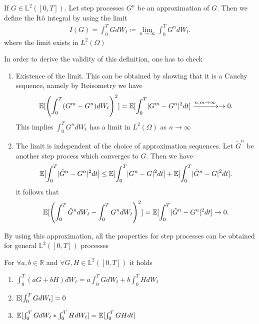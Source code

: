 \begin{definition}[It\^p Integral]\label{ito_integral}
  If $G \in  \mathbb{L}^2([0,T])$. Let step processes $G^{n} $ be an approximation of $G$. Then we define
  the It\^o  integral by using the limit 
  \begin{align*}
    I(G) = \int_0^{T} GdW_t \coloneqq  \lim_{n\to \infty} \int_0^{T} G^{n} dW_t
  .\end{align*}
  where the limit exists in $L^2(\Omega)$
\end{definition}
In order to derive the validity of this definition, one has to check 
\begin{enumerate}
  \item Existence of the limit. This can be obtained by showing that it is a Cauchy sequence, namely by It\o isometry we have
    \begin{align*}
      \mathbb{E}[\left( \int_0^{T} (G^{m} - G^{n}  ) dW_t  \right)^2 ] = \mathbb{E}[\int_0^{T} \lvert G^{m} - G^{n}  \rvert^2 dt] \xrightarrow{n,m\to \infty} \to 0
    .\end{align*}
    This implies $\int_0^{T} G^{n} dW_t  $ has a limit in $L^2(\Omega )$ as $n\to \infty$
  \item The limit is independent of the choice of approximation sequences.
    Let $\tilde{G}^{n}  $ be another step process which converges to $G$. Then we have 
    \begin{align*}
      \mathbb{E}[\int_0^{T} \lvert\tilde{G}^{n} - G^{n}   \rvert^2 dt ] \le  \mathbb{E}[\int_0^{T} \lvert G^{n} - G \rvert^2 dt ] + \mathbb{E}[\int_0^{T} \lvert\tilde{G}^{n} - G  \rvert^2 dt ]
    .\end{align*}
    it follows that 
    \begin{align*}
      \mathbb{E}[\left( \int_0^{T} \tilde{G}^{n} dW_t - \int_0^{T} G^{n} dW_t      \right)^2 ] = \mathbb{E}[\int_0^{T} \lvert\tilde{G}^{n} - G^{n}   \rvert^2 dt ] \to 0
    .\end{align*}
\end{enumerate}
By using this approximation, all the properties for step  processes can be obtained for general $\mathbb{L}^2([0,T])$ processes
\begin{theorem}
  For $\forall  a,b \in  \mathbb{R}$  and $\forall  G,H \in \mathbb{L}^2([0,T])$ it holds 
  \begin{enumerate}
    \item $\int_0^{T} (aG+bH) dW_t = a\int_0^{T} GdW_t + b\int_0^{T} H dW_t   $ 
    \item $\mathbb{E}[\int_0^{T} GdW_t ] = 0$
    \item $\mathbb{E}[\int_0^{T} GdW_t * \int_0^{T} HdW_t  ] = \mathbb{E}[\int_0^{T} GH dt ]$
  \end{enumerate}
\end{theorem}
